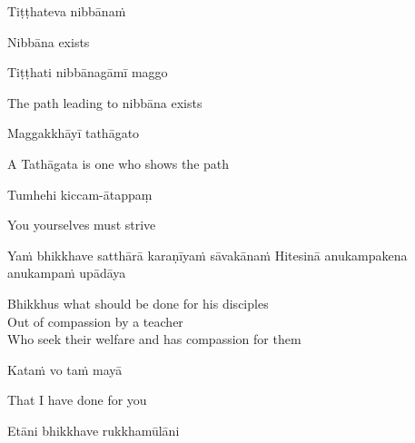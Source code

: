 
\begin{twochants}
Tiṭṭhateva nibbānaṁ
\end{twochants}

\begin{english}
Nibbāna exists
\end{english}

\begin{twochants}
Tiṭṭhati nibbānagāmī maggo
\end{twochants}

\begin{english}
The path leading to nibbāna exists
\end{english}

\begin{twochants}
Maggakkhāyī tathāgato
\end{twochants}

\begin{english}
A Tathāgata is one who shows the path
\end{english}


\begin{twochants}
Tumhehi kiccam-ātappaṃ
\end{twochants}

\begin{english}
You yourselves must strive
\end{english}


\begin{twochants}
Yaṁ bhikkhave satthārā karaṇīyaṁ sāvakānaṁ
Hitesinā anukampakena anukampaṁ upādāya
\end{twochants}

\begin{english}
Bhikkhus what should be done for his disciples\\
Out of compassion by a teacher\\
Who seek their welfare and has compassion for them
\end{english}

\begin{twochants}
Kataṁ vo taṁ mayā
\end{twochants}

\begin{english}
That I have done for you
\end{english}

\begin{twochants}
Etāni bhikkhave rukkhamūlāni
\end{twochants}

